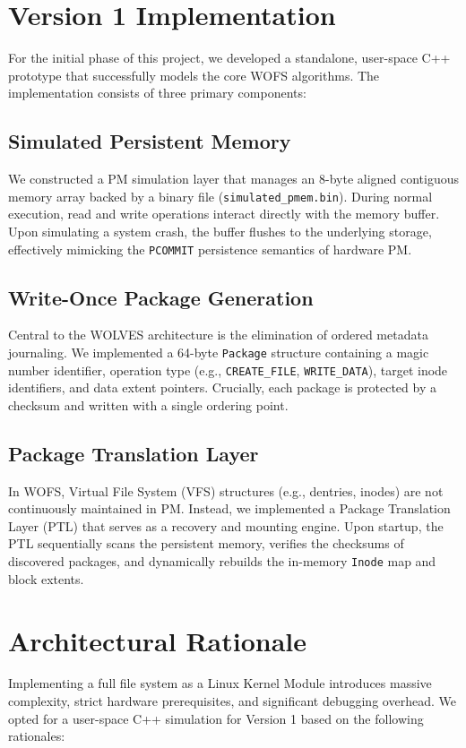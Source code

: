 \documentclass[conference]{IEEEtran}
\begin{document}
\section{Version 1 Implementation}
For the initial phase of this project, we developed a standalone, user-space C++ prototype that successfully models the core WOFS algorithms. The implementation consists of three primary components:

\subsection{Simulated Persistent Memory}
We constructed a PM simulation layer that manages an 8-byte aligned contiguous memory array backed by a binary file (\texttt{simulated\_pmem.bin}). During normal execution, read and write operations interact directly with the memory buffer. Upon simulating a system crash, the buffer flushes to the underlying storage, effectively mimicking the \texttt{PCOMMIT} persistence semantics of hardware PM.

\subsection{Write-Once Package Generation}
Central to the WOLVES architecture is the elimination of ordered metadata journaling. We implemented a 64-byte \texttt{Package} structure containing a magic number identifier, operation type (e.g., \texttt{CREATE\_FILE}, \texttt{WRITE\_DATA}), target inode identifiers, and data extent pointers. Crucially, each package is protected by a checksum and written with a single ordering point.

\subsection{Package Translation Layer}
In WOFS, Virtual File System (VFS) structures (e.g., dentries, inodes) are not continuously maintained in PM. Instead, we implemented a Package Translation Layer (PTL) that serves as a recovery and mounting engine. Upon startup, the PTL sequentially scans the persistent memory, verifies the checksums of discovered packages, and dynamically rebuilds the in-memory \texttt{Inode} map and block extents.

\section{Architectural Rationale}
Implementing a full file system as a Linux Kernel Module introduces massive complexity, strict hardware prerequisites, and significant debugging overhead. We opted for a user-space C++ simulation for Version 1 based on the following rationales:
\end{document}
